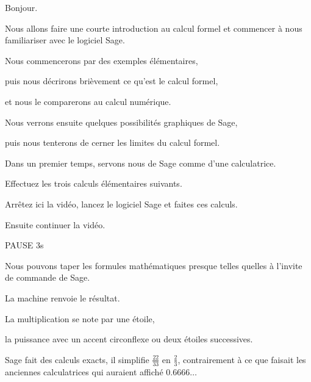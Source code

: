 






\debuttexte


\diapo

Bonjour.

Nous allons faire une courte introduction au calcul formel et commencer à nous familiariser avec le logiciel Sage.

\change

\change

Nous commencerons par des exemples élémentaires,

\change

puis nous décrirons brièvement ce qu'est le calcul formel,

\change

et nous le comparerons au calcul numérique.

\change

Nous verrons ensuite quelques possibilités graphiques de Sage,

\change

puis nous tenterons de cerner les limites du calcul formel.


\diapo

Dans un premier temps, servons nous de Sage comme d'une calculatrice. 

Effectuez les trois calculs élémentaires suivants.

Arrêtez ici la vidéo, lancez le logiciel Sage et faites ces calculs.

Ensuite continuer la vidéo.

PAUSE 3s

\change

Nous pouvons taper les formules mathématiques presque telles quelles à 
l'invite de commande de Sage. 

\change
La machine renvoie le résultat.

La multiplication se note par une étoile, 

la puissance avec un accent circonflexe ou deux étoiles successives.


\change

\change
Sage fait des calculs exacts, 
il simplifie $\frac{22}{33}$ en 
  $\frac{2}{3}$, contrairement à ce que faisait les anciennes calculatrices 
  qui auraient affiché $0.6666\ldots$
 
